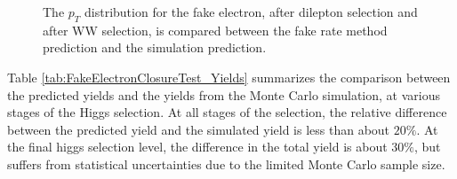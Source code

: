 \begin{figure}[!htbp]
\begin{center}
\caption{The $p_{T}$ distribution for the fake electron, after dilepton selection and after
WW selection, is compared between the fake rate method prediction and the simulation prediction. }
\label{fig:FakeElectronClosureTest_FakeElePt}
\end{center}
\end{figure}

Table \ref{tab:FakeElectronClosureTest_Yields} summarizes the comparison between the
predicted yields and the yields from the Monte Carlo simulation, at various stages
of the Higgs selection. At all stages of the selection, the relative difference
between the predicted yield and the simulated yield is less than about $20\%$. 
At the final higgs selection level, the difference in the total yield is about
$30\%$, but suffers from statistical uncertainties due to the limited Monte Carlo 
sample size. 

